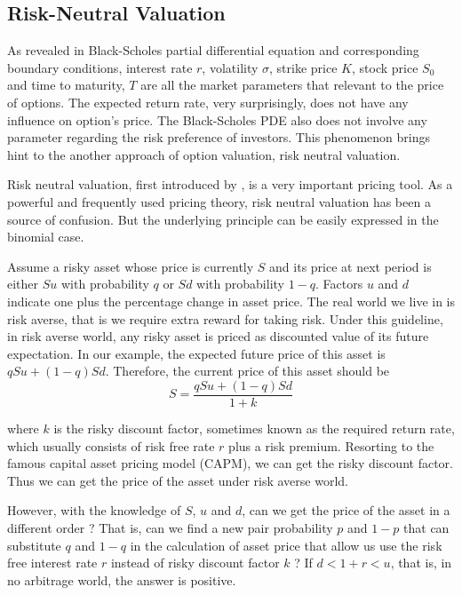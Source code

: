 \documentclass[11pt]{book}
\begin{document}
\subsection{Risk-Neutral Valuation}
As revealed in Black-Scholes partial differential equation and corresponding boundary conditions, interest rate $r$, volatility $\sigma$, strike price $K$, stock price $S_0$ and time to maturity, $T$  are all the market parameters that relevant to the price of options. The expected return rate, very surprisingly, does not have any influence on option's price. The Black-Scholes PDE also does not involve any parameter regarding the risk preference of investors. This phenomenon brings hint to the another approach of option valuation, risk neutral valuation. 

Risk neutral valuation, first introduced by \citet*{cox-ross1976}, is a very important pricing tool. As a powerful and frequently used pricing theory, risk neutral valuation has been a source of confusion. But the underlying principle can be easily expressed in the binomial case. 

Assume a risky asset whose price is currently $S$ and its price at next period is either $Su$ with probability $q$ or $Sd$ with probability $1-q$. Factors $u$ and $d$ indicate one plus the percentage change in asset price. The real world we live in is risk averse, that is we require extra reward for taking risk. Under this guideline, in risk averse world, any risky asset is priced as discounted value of its future expectation. In our example, the expected future price of this asset is $qSu+(1-q)Sd$. Therefore, the current price of this asset should be 
\begin{equation}
S=\frac{qSu+(1-q)Sd}{1+k}
\end{equation}

where $k$ is the risky discount factor, sometimes known as the required return rate, which usually consists of risk free rate $r$ plus a risk premium. Resorting to the famous capital asset pricing model (CAPM), we can get the risky discount factor. Thus we can get the price of the asset under risk averse world. 

However, with the knowledge of $S$, $u$ and $d$, can we get the price of the asset in a different order ? That is, can we find a new pair probability $p$ and $1-p$ that can substitute $q$ and $1-q$ in the calculation of asset price that allow us use the risk free interest rate $r$ instead of risky discount factor $k$ ? If  $d < 1+r < u$, that is, in no arbitrage world, the answer is positive. 
\end{document}
